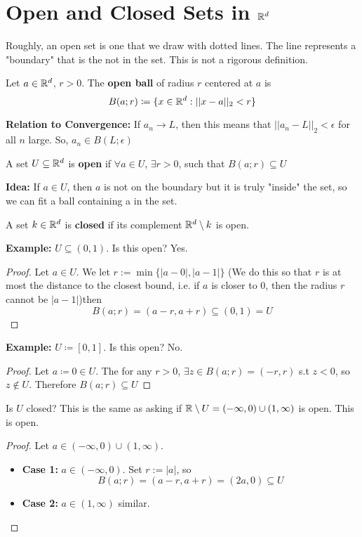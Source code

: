 \documentclass[openany]{report}
\begin{document}
\chapter{Open and Closed Sets in $\mathbb{R}^d$}
Roughly, an open set is one that we draw with dotted lines. The line represents a "boundary" that is the not in the set. This is not a rigorous definition.
\begin{definition}
    Let $a\in \mathbb{R}^d$, $r > 0$. The \textbf{open ball} of radius $r$ centered at $a$ is $$B(a;r) \coloneqq \{x \in \mathbb{R}^d: ||x-a||_2 < r\}$$
\end{definition}
\textbf{Relation to Convergence:} If $a_n \rightarrow L$, then this means that $||a_n - L ||_2 < \epsilon$ for all $n$ large. So, $a_n \in B(L;\epsilon)$
\begin{definition}
    A set $U \subseteq \mathbb{R}^d$ is \textbf{open} if $\forall a \in U$, $\exists r > 0$, such that $B(a; r) \subseteq U$
\end{definition}
\textbf{Idea:} If $a \in U$, then $a$ is not on the boundary but it is truly "inside" the set, so we can fit a ball containing a in the set.
\begin{definition}
    A set $k \in \mathbb{R}^d$ is \textbf{closed} if its complement $\mathbb{R}^d \setminus k$ is open. 
\end{definition}
\textbf{Example:} $U \subseteq (0,1)$. Is this open? Yes.
\begin{proof}
    Let $a \in U$. We let $r := \min\{|a-0|, |a-1|\}$ (We do this so that $r$ is at most the distance to the closest bound, i.e. if $a$ is closer to $0$, then the radius $r$ cannot be $|a-1|$)then 
    $$B(a ; r) = (a-r,a+r) \subseteq (0,1) = U$$
\end{proof}
\textbf{Example:} $U \coloneqq [0,1]$. Is this open? No.
\begin{proof}
    Let $a \coloneqq 0 \in U$. The for any $r > 0$, $\exists z \in B(a ; r) = (-r,r)$ s.t $z < 0$, so $z \not\in U$. Therefore $B(a;r) \subseteq U$
\end{proof}
Is $U$ closed? This is the same as asking if $\mathbb{R} \setminus U = (-\infty, 0) \cup (1,\infty)$ is open. 
This is open.
\begin{proof}
    Let $a \in (-\infty, 0) \cup (1,\infty)$.
    \begin{itemize}
        \item \textbf{Case 1:} $a \in (-\infty, 0)$. Set $r := |a|$, so 
        $$B(a;r) = (a-r,a+r) = (2a, 0) \subseteq U$$
        \item \textbf{Case 2:} $a \in (1, \infty)$ similar.
    \end{itemize}
\end{proof}
\end{document}
